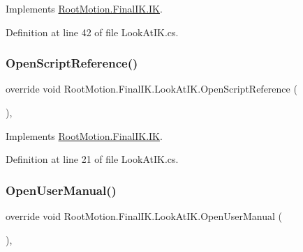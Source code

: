 Implements \mbox{\hyperlink{class_root_motion_1_1_final_i_k_1_1_i_k_ad9ef393e69cd16ba2d6fa06ba06b7a66}{Root\+Motion.\+Final\+I\+K.\+IK}}.



Definition at line 42 of file Look\+At\+I\+K.\+cs.

\mbox{\label{class_root_motion_1_1_final_i_k_1_1_look_at_i_k_a1bab9ccb38d81344fe51e00639efaac1}} 
\subsubsection{\texorpdfstring{Open\+Script\+Reference()}{OpenScriptReference()}}
{\footnotesize\ttfamily override void Root\+Motion.\+Final\+I\+K.\+Look\+At\+I\+K.\+Open\+Script\+Reference (\begin{DoxyParamCaption}{ }\end{DoxyParamCaption})\hspace{0.3cm}{\ttfamily [protected]}, {\ttfamily [virtual]}}



Implements \mbox{\hyperlink{class_root_motion_1_1_final_i_k_1_1_i_k_a260f283903b1305b99485c9474c83927}{Root\+Motion.\+Final\+I\+K.\+IK}}.



Definition at line 21 of file Look\+At\+I\+K.\+cs.

\mbox{\label{class_root_motion_1_1_final_i_k_1_1_look_at_i_k_abdc32a69392d71c9ce0f1c68778251a5}} 
\subsubsection{\texorpdfstring{Open\+User\+Manual()}{OpenUserManual()}}
{\footnotesize\ttfamily override void Root\+Motion.\+Final\+I\+K.\+Look\+At\+I\+K.\+Open\+User\+Manual (\begin{DoxyParamCaption}{ }\end{DoxyParamCaption})\hspace{0.3cm}{\ttfamily [protected]}, {\ttfamily [virtual]}}




